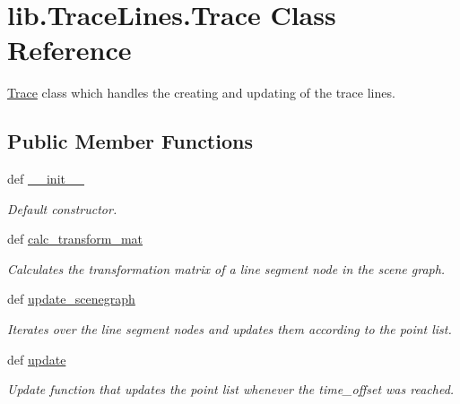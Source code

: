 \hypertarget{classlib_1_1TraceLines_1_1Trace}{\section{lib.\-Trace\-Lines.\-Trace \-Class \-Reference}
\label{classlib_1_1TraceLines_1_1Trace}
}


\hyperlink{classlib_1_1TraceLines_1_1Trace}{\-Trace} class which handles the creating and updating of the trace lines.  


\subsection*{\-Public \-Member \-Functions}
\begin{DoxyCompactItemize}
\item 
def \hyperlink{classlib_1_1TraceLines_1_1Trace_a4f8d2d88d7460dff9ba5481fe22e928a}{\-\_\-\-\_\-init\-\_\-\-\_\-}
\begin{DoxyCompactList}\small\item\em \-Default constructor. \end{DoxyCompactList}\item 
def \hyperlink{classlib_1_1TraceLines_1_1Trace_ac2d612a6589e5db82b8b87569a4003d6}{calc\-\_\-transform\-\_\-mat}
\begin{DoxyCompactList}\small\item\em \-Calculates the transformation matrix of a line segment node in the scene graph. \end{DoxyCompactList}\item 
def \hyperlink{classlib_1_1TraceLines_1_1Trace_a7be07136a0c69f4da141ef1a59b91e58}{update\-\_\-scenegraph}
\begin{DoxyCompactList}\small\item\em \-Iterates over the line segment nodes and updates them according to the point list. \end{DoxyCompactList}\item 
def \hyperlink{classlib_1_1TraceLines_1_1Trace_a8e74cf7e71dd5de2b1c308f82aec01ad}{update}
\begin{DoxyCompactList}\small\item\em \-Update function that updates the point list whenever the time\-\_\-offset was reached. \end{DoxyCompactList}\end{DoxyCompactItemize}
